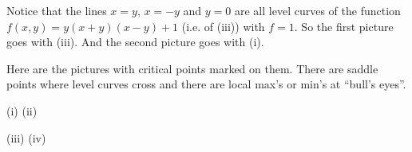 \begin{solution}
Notice that the lines $x=y$, $x=-y$ and $y=0$ are all level curves
of the function $f(x, y) = y(x + y)(x - y) + 1$ (i.e. of (iii))
with $f=1$. So the first picture goes with (iii). And the second picture
goes with (i).

Here are the pictures with critical points marked on them.
There are saddle points where level curves cross and there
are local max's or min's at ``bull's eyes''.
\begin{center}
(i)   
\quad
(ii)  
\end{center}
\begin{center}
(iii)   
\quad
(iv)   
\end{center}
\end{solution}

